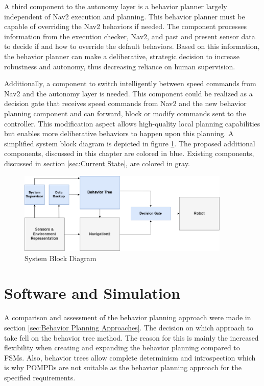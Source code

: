 A third component to the autonomy layer is a behavior planner largely independent of Nav2 execution and planning. This behavior planner must be capable of overriding the Nav2 behaviors if needed. The component processes information from the execution checker, Nav2, and past and present sensor data to decide if and how to override the default behaviors. Based on this information, the behavior planner can make a deliberative, strategic decision to increase robustness and autonomy, thus decreasing reliance on human supervision.

Additionally, a component to switch intelligently between speed commands from Nav2 and the autonomy layer is needed. This component could be realized as a decision gate that receives speed commands from Nav2 and the new behavior planning component and can forward, block or modify commands sent to the controller. This modification aspect allows high-quality local planning capabilities but enables more deliberative behaviors to happen upon this planning. A simplified system block diagram is depicted in figure \ref{fig:block_diagram}. The proposed additional components, discussed in this chapter are colored in blue. Existing components, discussed in section \ref{sec:Current State}, are colored in gray. 

\begin{figure}[ht]
	\centering 
	\includegraphics[width=0.9\textwidth]{images/block_diagram.png}
	\caption{System Block Diagram}
	\label{fig:block_diagram}
\end{figure}


\section{Software and Simulation}

A comparison and assessment of the behavior planning approach were made in section \ref{sec:Behavior Planning Approaches}. The decision on which approach to take fell on the behavior tree method. The reason for this is mainly the increased flexibility when creating and expanding the behavior planning compared to FSMs. Also, behavior trees allow complete determinism and introspection which is why POMPDs are not suitable as the behavior planning approach for the specified requirements. 

